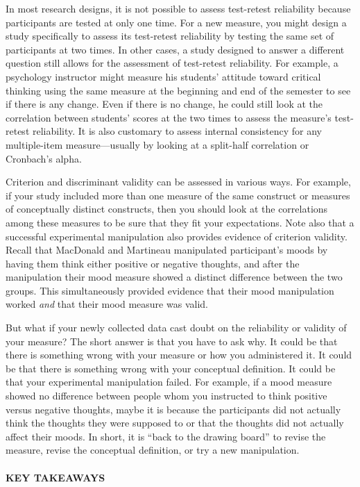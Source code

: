 \documentclass[
]{krantz}
\begin{document}
In most research designs, it is not possible to assess test-retest reliability because participants are tested at only one time. For a new measure, you might design a study specifically to assess its test-retest reliability by testing the same set of participants at two times. In other cases, a study designed to answer a different question still allows for the assessment of test-retest reliability. For example, a psychology instructor might measure his students' attitude toward critical thinking using the same measure at the beginning and end of the semester to see if there is any change. Even if there is no change, he could still look at the correlation between students' scores at the two times to assess the measure's test-retest reliability. It is also customary to assess internal consistency for any multiple-item measure---usually by looking at a split-half correlation or Cronbach's alpha.

Criterion and discriminant validity can be assessed in various ways. For example, if your study included more than one measure of the same construct or measures of conceptually distinct constructs, then you should look at the correlations among these measures to be sure that they fit your expectations. Note also that a successful experimental manipulation also provides evidence of criterion validity. Recall that MacDonald and Martineau manipulated participant's moods by having them think either positive or negative thoughts, and after the manipulation their mood measure showed a distinct difference between the two groups. This simultaneously provided evidence that their mood manipulation worked \emph{and} that their mood measure was valid.

But what if your newly collected data cast doubt on the reliability or validity of your measure? The short answer is that you have to ask why. It could be that there is something wrong with your measure or how you administered it. It could be that there is something wrong with your conceptual definition. It could be that your experimental manipulation failed. For example, if a mood measure showed no difference between people whom you instructed to think positive versus negative thoughts, maybe it is because the participants did not actually think the thoughts they were supposed to or that the thoughts did not actually affect their moods. In short, it is ``back to the drawing board'' to revise the measure, revise the conceptual definition, or try a new manipulation.

\hypertarget{key-takeaways-16}{%
\paragraph*{KEY TAKEAWAYS}\label{key-takeaways-16}}
\end{document}
